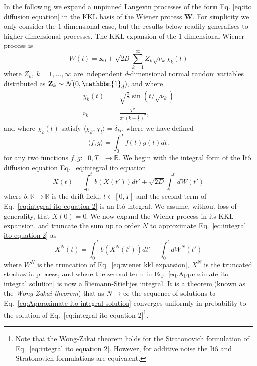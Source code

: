 In the following we expand a unpinned Langevin processes of the form Eq. \ref{eq:ito diffusion equation} in the KKL basis of the Wiener process $\mathbf{W}$. For simplicity we only consider the $1$-dimensional case, but the results below readily generalises to higher dimensional processes. The KKL expansion of the $1$-dimensional Wiener process is
\begin{equation} \label{eq:wiener kkl expansion}
	W(t) = \mathbf{x}_0 +\sqrt{2 D} \sum_{k=1}^\infty Z_k \sqrt{\nu_k} \chi_k(t)
\end{equation}
where $Z_k,\ k =1,\dots,\infty$ are independent $d$-dimensional normal random variables distributed as $\mathbf{Z}_k \sim \mathcal{N}(0, \mathbbm{1}_d)$, and where
\begin{subequations}
	\begin{align}
		\chi_k(t) & = \sqrt{\frac{2}{T}} \sin (t / \sqrt{\nu_k}) \\
		\nu_k & = \frac{T^2}{\pi^2 \left(k - \frac{1}{2} \right)^2},
	\end{align}
\end{subequations}
and where $\chi_k(t)$ satisfy $\langle \chi_k, \chi_l \rangle = \delta_{kl}$, where we have defined
\begin{equation}
	\langle f, g \rangle = \int_0^T f(t) g(t) dt.
\end{equation}
for any two functions $f, g : [0,T] \to \mathbb{R}$. We begin with the integral form of the It\^{o} diffusion equation Eq.~\ref{eq:integral ito equation}
\begin{equation} \label{eq:integral ito equation 2}
X(t) = \int_0^t b(X(t')) dt' + \sqrt{2D} \int_0^{t} d W(t')
\end{equation}
where $b : \mathbb{R} \to \mathbb{R}$ is the drift-field, $t \in [0, T]$ and the second term of Eq.~\ref{eq:integral ito equation 2} is an It\^{o} integral. We assume, without loss of generality, that $X(0) = 0$. We now expand the Wiener process in its KKL expansion, and truncate the sum up to order $N$ to approximate Eq.~\ref{eq:integral ito equation 2} as
\begin{equation} \label{eq:Approximate ito integral solution}
X^N(t) = \int_0^t b(X^N(t')) dt' + \int_0^t dW^N(t')
\end{equation}
where $W^N$ is the truncation of Eq.~\ref{eq:wiener kkl expansion}, $X^N$ is the truncated stochastic process, and where the second term in Eq.~\ref{eq:Approximate ito integral solution} is now a Riemann-Stieltjes integral. It is a theorem (known as the \textit{Wong-Zakai theorem}) \citep{wongConvergenceOrdinaryIntegrals1965a, twardowskaWongZakaiApproximationsStochastic1996a, frizMultidimensionalStochasticProcesses2010a} that as $N\to\infty$ the sequence of solutions to Eq.~\ref{eq:Approximate ito integral solution} converges uniformly in probability to the solution of Eq.~\ref{eq:integral ito equation 2}\footnote{Note that the Wong-Zakai theorem holds for the Stratonovich formulation of Eq.~\ref{eq:integral ito equation 2}. However, for additive noise the It\^{o} and Stratonovich formulations are equivalent.}.


